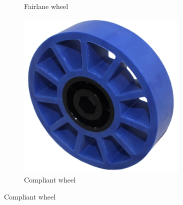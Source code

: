 \begin{figure}[H]
\begin{subfigure}[b]{.19\linewidth}
			\caption{Fairlane wheel}
		\end{subfigure}\begin{subfigure}[b]{.19\linewidth}
			\includegraphics[width=0.9\textwidth]{imgs/wheel_compliant.png}
			\caption{Compliant wheel}
		\end{subfigure}
	\end{figure}
	
